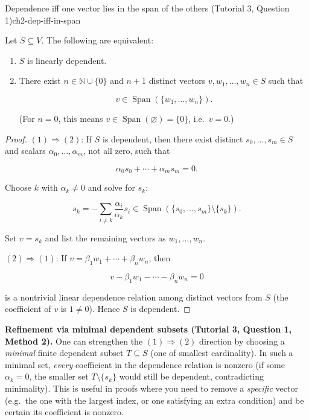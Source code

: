 \begin{theorem}{Dependence iff one vector lies in the span of the others (Tutorial 3, Question 1)}{ch2-dep-iff-in-span}

Let $S\subseteq V$. The following are equivalent:

\begin{enumerate}

\item $S$ is linearly dependent.

\item There exist $n\in\mathbb{N}\cup\{0\}$ and $n+1$ distinct vectors $v,w_1,\ldots,w_n\in S$ such that

\[
v\in \operatorname{Span}(\{w_1,\ldots,w_n\}).
\]

(For $n=0$, this means $v\in\operatorname{Span}(\varnothing)=\{0\}$, i.e.\ $v=0$.)

\end{enumerate}

\begin{proof}

$(1)\Rightarrow(2)$: If $S$ is dependent, then there exist distinct $s_0,\ldots,s_m\in S$ and scalars $\alpha_0,\ldots,\alpha_m$, not all zero, such that

\[
\alpha_0 s_0+\cdots+\alpha_m s_m=0.
\]

Choose $k$ with $\alpha_k\neq 0$ and solve for $s_k$:

\[
s_k=-\sum_{i\neq k}\frac{\alpha_i}{\alpha_k}s_i\in \operatorname{Span}(\{s_0,\ldots,s_m\}\setminus\{s_k\}).
\]

Set $v=s_k$ and list the remaining vectors as $w_1,\ldots,w_n$.

$(2)\Rightarrow(1)$: If $v=\beta_1 w_1+\cdots+\beta_n w_n$, then

\[
v-\beta_1 w_1-\cdots-\beta_n w_n=0
\]

is a nontrivial linear dependence relation among distinct vectors from $S$ (the coefficient of $v$ is $1\neq 0$). Hence $S$ is dependent.

\end{proof}

\end{theorem}

\begin{policynote}
\textbf{Refinement via minimal dependent subsets (Tutorial 3, Question 1, Method 2).}
One can strengthen the $(1)\Rightarrow(2)$ direction by choosing a \emph{minimal} finite dependent subset $T\subseteq S$ (one of smallest cardinality).  In such a minimal set, \emph{every} coefficient in the dependence relation is nonzero (if some $\alpha_k=0$, the smaller set $T\setminus\{s_k\}$ would still be dependent, contradicting minimality).
This is useful in proofs where you need to remove a \emph{specific} vector (e.g.\ the one with the largest index, or one satisfying an extra condition) and be certain its coefficient is nonzero.
\end{policynote}

